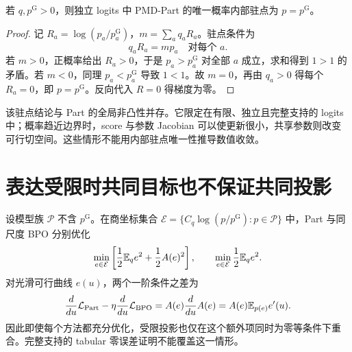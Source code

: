 \begin{proposition}
\label{prop:geometry-part-stationary}
若 $q,p^{\mathrm G}>0$，则独立 logits 中 PMD-Part 的唯一概率内部驻点为 $p=p^{\mathrm G}$。
\end{proposition}
\begin{proof}
记 $R_a=\log(p_a/p_a^{\mathrm G})$，$m=\sum_aq_aR_a$。驻点条件为
\begin{equation}
q_aR_a=mp_a\quad\text{对每个 }a.
\end{equation}
若 $m>0$，正概率给出 $R_a>0$，于是 $p_a>p_a^{\mathrm G}$ 对全部 $a$ 成立，求和得到 $1>1$ 的矛盾。若 $m<0$，同理 $p_a<p_a^{\mathrm G}$ 导致 $1<1$。故 $m=0$，再由 $q_a>0$ 得每个 $R_a=0$，即 $p=p^{\mathrm G}$。反向代入 $R=0$ 得梯度为零。
\end{proof}

该驻点结论与 Part 的全局非凸性并存。它限定在有限、独立且完整支持的 logits 中；概率趋近边界时，score 与参数 Jacobian 可以使更新很小，共享参数则改变可行切空间。这些情形不能用内部驻点唯一性推导数值收敛。

\section{表达受限时共同目标也不保证共同投影}
\label{sec:geometry-restricted}
设模型族 $\mathcal P$ 不含 $p^{\mathrm G}$。在商坐标集合 $\mathcal E=\{C_q\log(p/p^{\mathrm G}):p\in\mathcal P\}$ 中，Part 与同尺度 BPO 分别优化
\begin{equation}
\min_{e\in\mathcal E}\left[\frac12\mathbb E_qe^2+\frac12A(e)^2\right],
\qquad \min_{e\in\mathcal E}\frac12\mathbb E_qe^2.
\end{equation}
对光滑可行曲线 $e(u)$，两个一阶条件之差为
\begin{equation}
\frac d{du}\mathcal L_{\mathrm{Part}}
-\eta\frac d{du}\mathcal L_{\mathrm{BPO}}
=A(e)\frac d{du}A(e)
=A(e)\mathbb E_{p(e)}e'(u).
\end{equation}
因此即使每个方法都充分优化，受限投影也仅在这个额外项同时为零等条件下重合。完整支持的 tabular 零误差证明不能覆盖这一情形。

